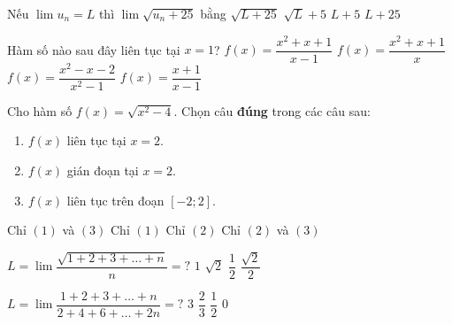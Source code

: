 \begin{ex}%
	Nếu $\lim u_n=L$ thì $\lim\sqrt{u_n+25}$ bằng
	\choice
	{\True $\sqrt{L+25}$}
	{$\sqrt{L}+5$}
	{$L+5$}
	{$L+25$}
\end{ex}

\begin{ex}%
	Hàm số nào sau đây liên tục tại $x=1$?
	\choice
	{$f(x)=\dfrac{x^2+x+1}{x-1}$}
	{\True $f(x)=\dfrac{x^2+x+1}{x}$}
	{$f(x)=\dfrac{x^2-x-2}{x^2-1}$}
	{$f(x)=\dfrac{x+1}{x-1}$}
\end{ex}

\begin{ex}%
	Cho hàm số $f(x)=\sqrt{x^2-4}$. Chọn câu \textbf{đúng} trong các câu sau:
	\begin{enumerate}[(1)]
		\item $f(x)$ liên tục tại $x=2$.
		\item $f(x)$ gián đoạn tại $x=2$.
		\item $f(x)$ liên tục trên đoạn $[-2;2]$.
	\end{enumerate}
	\choice
	{\True Chỉ $(1)$ và $(3)$}
	{Chỉ $(1)$}
	{Chỉ $(2)$}
	{Chỉ $(2)$ và $(3)$}

\end{ex}

\begin{ex}%
	$L=\lim\dfrac{\sqrt{1+2+3+\ldots+n}}{n}=?$
	\choice
	{$1$}
	{$\sqrt{2}$}
	{$\dfrac{1}{2}$}
	{\True $\dfrac{\sqrt{2}}{2}$}
\end{ex}

\begin{ex}%
	$L=\lim\dfrac{1+2+3+\ldots+n}{2+4+6+\ldots+2n}=?$
	\choice
	{$3$}
	{$\dfrac{2}{3}$}
	{\True $\dfrac{1}{2}$}
	{$0$}
\end{ex}

